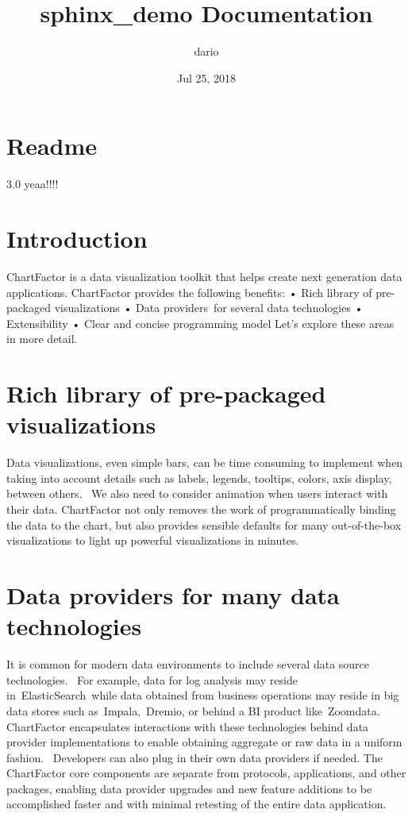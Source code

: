 \documentclass[letterpaper,10pt,english]{sphinxmanual}
\title{sphinx\_demo Documentation}
\date{Jul 25, 2018}
\author{dario}
\begin{document}
\maketitle
\sphinxtableofcontents
{}\label{\detokenize{index::doc}}



\chapter{Readme}
\label{\detokenize{index:readme}}\label{\detokenize{index:welcome-to-chartfactor-documentation}}
3.0 yeaa!!!!


\chapter{Introduction}
\label{\detokenize{index:introduction}}
ChartFactor is a data visualization toolkit that helps create next generation data applications.
ChartFactor provides the following benefits:
•       Rich library of pre-packaged visualizations
•       Data providers for several data technologies
•       Extensibility
•       Clear and concise programming model
Let’s explore these areas in more detail.


\chapter{Rich library of pre-packaged visualizations}
\label{\detokenize{index:rich-library-of-pre-packaged-visualizations}}
Data visualizations, even simple bars, can be time consuming to implement when taking into account details such as labels, legends, tooltips, colors, axis display, between others.  We also need to consider animation when users interact with their data.
ChartFactor not only removes the work of programmatically binding the data to the chart, but also provides sensible defaults for many out-of-the-box visualizations to light up powerful visualizations in minutes.


\chapter{Data providers for many data technologies}
\label{\detokenize{index:data-providers-for-many-data-technologies}}
It is common for modern data environments to include several data source technologies.  For example, data for log analysis may reside in ElasticSearch while data obtained from business operations may reside in big data stores such as Impala, Dremio, or behind a BI product like Zoomdata.
ChartFactor encapsulates interactions with these technologies behind data provider implementations to enable obtaining aggregate or raw data in a uniform fashion.  Developers can also plug in their own data providers if needed.
The ChartFactor core components are separate from protocols, applications, and other packages, enabling data provider upgrades and new feature additions to be accomplished faster and with minimal retesting of the entire data application.
\end{document}
